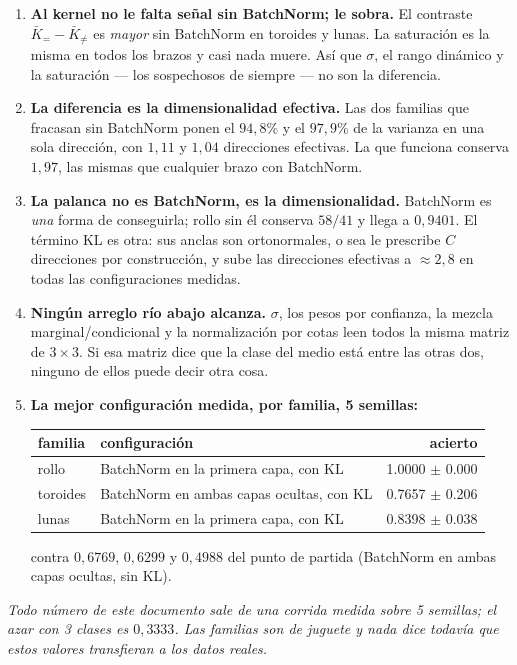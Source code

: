 \documentclass[11pt,a4paper]{article}
\begin{document}
\begin{enumerate}\itemsep3pt
\item \textbf{Al kernel no le falta señal sin BatchNorm; le sobra.} El contraste
  $\bar K_{=} - \bar K_{\neq}$ es \emph{mayor} sin BatchNorm en toroides y lunas.
  La saturación es la misma en todos los brazos y casi nada muere. Así que $\sigma$,
  el rango dinámico y la saturación --- los sospechosos de siempre --- no son la
  diferencia.

\item \textbf{La diferencia es la dimensionalidad efectiva.} Las dos familias que
  fracasan sin BatchNorm ponen el $94{,}8\%$ y el $97{,}9\%$ de la varianza en una
  sola dirección, con $1{,}11$ y $1{,}04$ direcciones efectivas. La que funciona
  conserva $1{,}97$, las mismas que cualquier brazo con BatchNorm.

\item \textbf{La palanca no es BatchNorm, es la dimensionalidad.} BatchNorm es
  \emph{una} forma de conseguirla; rollo sin él conserva $58/41$ y llega a
  $0{,}9401$. El término KL es otra: sus anclas son ortonormales, o sea le
  prescribe $C$ direcciones por construcción, y sube las direcciones efectivas a
  $\approx 2{,}8$ en todas las configuraciones medidas.

\item \textbf{Ningún arreglo río abajo alcanza.} $\sigma$, los pesos por confianza,
  la mezcla marginal/condicional y la normalización por cotas leen todos la misma
  matriz de $3\times3$. Si esa matriz dice que la clase del medio está entre las
  otras dos, ninguno de ellos puede decir otra cosa.

\item \textbf{La mejor configuración medida, por familia, 5 semillas:}
  \begin{center}
  \begin{tabular}{llr}
    \toprule
    familia & configuración & acierto \\
    \midrule
        rollo & BatchNorm en la primera capa, con KL & 1.0000 $\pm$ 0.000 \\
    toroides & BatchNorm en ambas capas ocultas, con KL & 0.7657 $\pm$ 0.206 \\
    lunas & BatchNorm en la primera capa, con KL & 0.8398 $\pm$ 0.038 \\
    \bottomrule
  \end{tabular}
  \end{center}
  contra $0{,}6769$, $0{,}6299$ y $0{,}4988$ del punto de partida (BatchNorm en
  ambas capas ocultas, sin KL).
\end{enumerate}

\vspace{6pt}
\begin{center}\small\itshape
Todo número de este documento sale de una corrida medida sobre 5 semillas; el
azar con 3 clases es $0{,}3333$. Las familias son de juguete y nada dice todavía
que estos valores transfieran a los datos reales.
\end{center}
\end{document}

